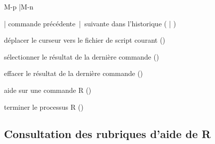 \begin{ttscript}{M-p |M-n}
\item[\code{M-p} | \code{M-n}] commande précédente~|~suivante
  dans l'historique \newline
  ( | \newline
  )
\item[\code{C-c C-z}] déplacer le curseur vers le fichier de script
  courant \newline
  ()
\item[\code{M-h}] sélectionner le résultat de la dernière commande \newline
  ()
\item[\code{C-c C-o}] effacer le résultat de la dernière commande \newline
  ()
\item[\code{C-c C-v}] aide sur une commande R
  ()
\item[\code{C-c C-q}] terminer le processus R ()
\end{ttscript}

\subsection{Consultation des rubriques d'aide de R}
\label{sec:emacs+ess:commandes:aide}

